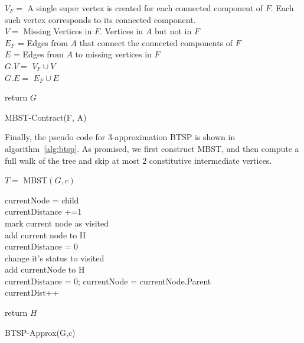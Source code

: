 \documentclass[runningheads, a4paper]{llncs}
\begin{document}
\begin{algorithm}[H]
    
    $V_{F} = $ A single super vertex is created for each connected component of $F$. Each such vertex corresponds to its connected component. \\
    $V = $ Missing Vertices in $F$. Vertices in $A$ but not in $F$ \\
    
    $E_{F}$ = Edges from $A$ that connect the connected components of $F$\\
    $E$ = Edges from $A$ to missing vertices in $F$ \\
    
    $G.V = $ $V_{F} \cup V $ \\
    $G.E = $ $E_{F} \cup E $
    
    return $G$
    
    \caption{MBST-Contract(F, A)}
    \label{alg:mbst_contract}
\end{algorithm}

Finally, the pseudo code for 3-approximation BTSP is shown in algorithm~\ref{alg:btsp}. As promised, we first construct MBST, and then compute a full walk of the tree and skip at most 2 constitutive intermediate vertices.

\begin{algorithm}[H]
    $T = $ MBST$(G,c)$ \\
    
    {
		{
			{
				currentNode = child\\
				currentDistance +=1\\
				{
					mark current node as visited \\
					add current node to H\\
					currentDistance = 0 \\
				}
			}
		}
		{
			{
				change it's status to visited\\
				add currentNode to H\\
				currentDistance = 0;
			}
			{
				currentNode = currentNode.Parent\\
				currentDist++\\
			}
		}		
		
    }
    
    return $H$
    \caption{BTSP-Approx(G,c)}
    \label{alg:btsp}
\end{algorithm}
\end{document}

